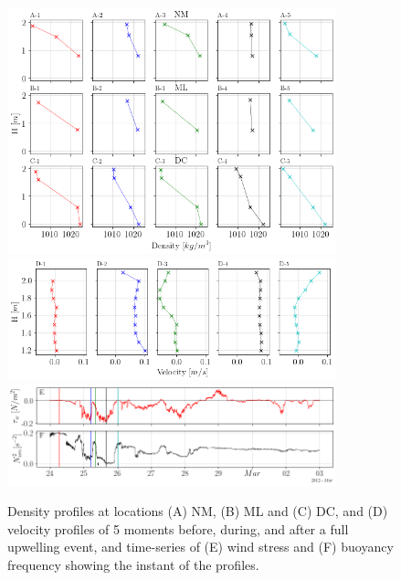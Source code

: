 \documentclass[tesis.tex]{subfiles}
\begin{document}
    \begin{figure}[h!]
      \centering
      \includegraphics[width=0.85\textwidth]{Imagenes/perf.png}
      \includegraphics[width=0.85\textwidth]{Imagenes/vel.png}
      \includegraphics[width=0.85\textwidth]{Imagenes/n2.png}
      \caption{Density profiles at locations (A) NM, (B) ML and (C) DC, and (D) velocity profiles of 5 moments before, during, and after a full upwelling event, and time-series of (E) wind stress and (F) buoyancy frequency showing the instant of the profiles.}
      \label{fig:perfiles2}
    \end{figure}

    \newpage
    
\end{document}
